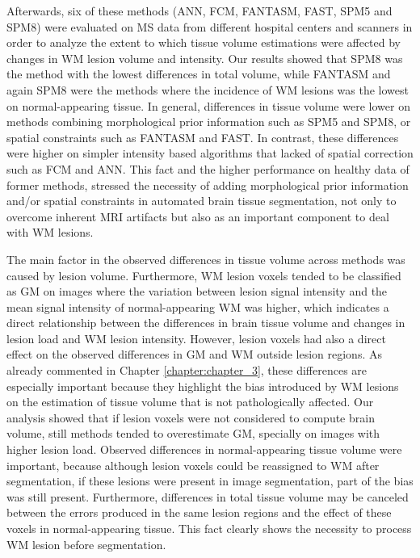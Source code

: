 Afterwards, six of these methods (ANN, FCM, FANTASM, FAST, SPM5 and SPM8) were evaluated on MS data from different hospital centers and scanners in order to analyze the extent to which tissue volume estimations were affected by changes in WM lesion volume and intensity. Our results showed that SPM8 was the method with the lowest differences in total volume, while FANTASM and again SPM8 were the methods where the incidence of WM lesions was the lowest on normal-appearing tissue. In general, differences in tissue volume were lower on methods combining morphological prior information such as SPM5 and SPM8, or spatial constraints such as FANTASM and FAST. In contrast, these differences were higher on simpler intensity based algorithms that lacked of spatial correction such as FCM and ANN. This fact and the higher performance on healthy data of former methods, stressed the necessity of adding morphological prior information and/or spatial constraints in automated brain tissue segmentation, not only to overcome inherent MRI artifacts but also as an important component to deal with WM lesions.

The main factor in the observed differences in tissue volume across methods was caused by lesion volume. Furthermore, WM lesion voxels tended to be classified as GM on images where the variation between lesion signal intensity and the mean signal intensity of normal-appearing WM was higher, which indicates a direct relationship between the differences in brain tissue volume and changes in lesion load and WM lesion intensity. However, lesion voxels had also a direct effect on the observed differences in GM and WM outside lesion regions. As already commented in Chapter \ref{chapter:chapter_3}, these differences are especially important because they highlight the bias introduced by WM lesions on the estimation of tissue volume that is not pathologically affected. Our analysis showed that if lesion voxels were not considered to compute brain volume, still methods tended to overestimate GM, specially on images with higher lesion load. Observed differences in normal-appearing tissue volume were important, because although lesion voxels could be reassigned to WM after segmentation, if these lesions were present in image segmentation, part of the bias was still present. Furthermore, differences in total tissue volume may be canceled between the errors produced in the same lesion regions and the effect of these voxels in normal-appearing tissue. This fact clearly shows the necessity to process WM lesion before segmentation.


